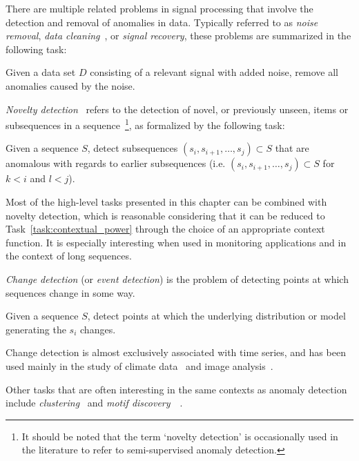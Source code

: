 There are multiple related problems in signal processing that involve the detection and removal of anomalies in data. Typically referred to as \emph{noise removal}, \emph{data cleaning}~\cite{meckesheimer}, or \emph{signal recovery}, these problems are summarized in the following task:
\begin{task}
  Given a data set $D$ consisting of a relevant signal with added noise, remove all anomalies caused by the noise.
\end{task}

\emph{Novelty detection}~\cite{chandola} refers to the detection of novel, or previously unseen, items or subsequences in a sequence~\footnote{It should be noted that the term `novelty detection' is occasionally used in the literature to refer to semi-supervised anomaly detection.}, as formalized by the following task:
\begin{task}
\label{task:novelty_detection}
  Given a sequence $S$, detect subsequences $(s_i, s_{i+1}, \dots, s_j) \subset S$ that are anomalous with regards to earlier subsequences (i.e. $(s_i, s_{i+1}, \dots, s_j) \subset S$ for $k < i$ and $l < j$).
\end{task}
Most of the high-level tasks presented in this chapter can be combined with novelty detection, which is reasonable considering that it can be reduced to Task~\ref{task:contextual_power} through the choice of an appropriate context function. It is especially interesting when used in monitoring applications and in the context of long sequences.

\emph{Change detection} (or \emph{event detection}) is the problem of detecting points at which sequences change in some way.
\begin{task}
      Given a sequence $S$, detect points at which the underlying distribution or model generating the $s_i$ changes.
\end{task}
Change detection is almost exclusively associated with time series, and has been used mainly in the study of climate data~\cite{gopala} and image analysis~\cite{radke}.

Other tasks that are often interesting in the same contexts as anomaly detection include \emph{clustering}~\cite{clustering} and \emph{motif discovery}~\cite{motif}~\cite{motif2}.

